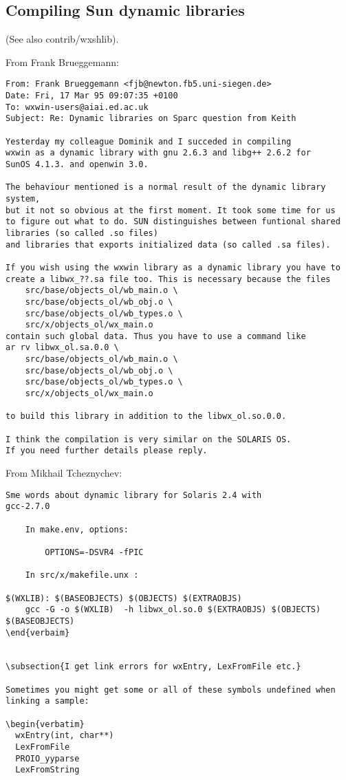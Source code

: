 \subsection{Compiling Sun dynamic libraries}

(See also contrib/wxshlib).

From Frank Brueggemann:

\begin{verbatim}
From: Frank Brueggemann <fjb@newton.fb5.uni-siegen.de>
Date: Fri, 17 Mar 95 09:07:35 +0100
To: wxwin-users@aiai.ed.ac.uk
Subject: Re: Dynamic libraries on Sparc question from Keith

Yesterday my colleague Dominik and I succeded in compiling 
wxwin as a dynamic library with gnu 2.6.3 and libg++ 2.6.2 for
SunOS 4.1.3. and openwin 3.0.

The behaviour mentioned is a normal result of the dynamic library system,
but it not so obvious at the first moment. It took some time for us 
to figure out what to do. SUN distinguishes between funtional shared
libraries (so called .so files) 
and libraries that exports initialized data (so called .sa files).

If you wish using the wxwin library as a dynamic library you have to
create a libwx_??.sa file too. This is necessary because the files
    src/base/objects_ol/wb_main.o \
    src/base/objects_ol/wb_obj.o \
    src/base/objects_ol/wb_types.o \
    src/x/objects_ol/wx_main.o 
contain such global data. Thus you have to use a command like
ar rv libwx_ol.sa.0.0 \
    src/base/objects_ol/wb_main.o \
    src/base/objects_ol/wb_obj.o \
    src/base/objects_ol/wb_types.o \
    src/x/objects_ol/wx_main.o 

to build this library in addition to the libwx_ol.so.0.0.

I think the compilation is very similar on the SOLARIS OS.
If you need further details please reply.
\end{verbatim}

From Mikhail Tcheznychev:

\begin{verbatim}
Sme words about dynamic library for Solaris 2.4 with
gcc-2.7.0

    In make.env, options:

        OPTIONS=-DSVR4 -fPIC

    In src/x/makefile.unx :

$(WXLIB): $(BASEOBJECTS) $(OBJECTS) $(EXTRAOBJS)
	gcc -G -o $(WXLIB)  -h libwx_ol.so.0 $(EXTRAOBJS) $(OBJECTS) $(BASEOBJECTS)
\end{verbaim}


\subsection{I get link errors for wxEntry, LexFromFile etc.}

Sometimes you might get some or all of these symbols undefined when
linking a sample:

\begin{verbatim}
  wxEntry(int, char**)
  LexFromFile
  PROIO_yyparse
  LexFromString
\end{verbatim}

